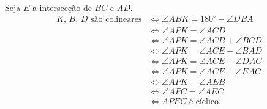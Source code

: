 \documentclass[10pt,a4paper]{scrartcl}
\begin{document}
	\begin{sol}
		Seja \(E\) a intersecção de \(BC\) e \(AD\).
		\begin{align*}
			\text{\(K\), \(B\), \(D\) são colineares}
			&\iff \angle ABK = 180^\circ - \angle DBA \\
			&\iff \angle APK = \angle ACD \\
			&\iff \angle APK = \angle ACB + \angle BCD \\
			&\iff \angle APK = \angle ACE + \angle BAD \\
			&\iff \angle APK = \angle ACE + \angle DAC \\
			&\iff \angle APK = \angle ACE + \angle EAC \\
			&\iff \angle APK = \angle AEB \\
			&\iff \angle APC = \angle AEC \\
			&\iff \text{\(APEC\) é cíclico.}
		\end{align*}
	\end{sol}
\end{document}
